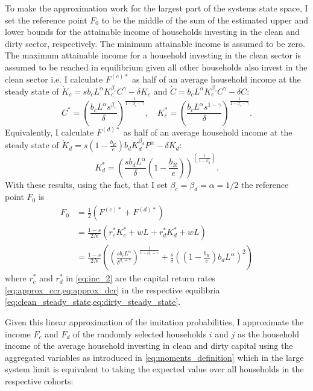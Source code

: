 To make the approximation work for the largest part of the systems state space, I set the reference point $F_0$ to be the middle of the sum of the estimated upper and lower bounds for the attainable income of households investing in the clean and dirty sector, respectively. The minimum attainable income is assumed to be zero. The maximum attainable income for a household investing in the clean sector is assumed to be reached in equilibrium given all other households also invest in the clean sector i.e. I calculate $F^{(c)*}$ as half of an average household income at the steady state of $\dot{K}_c = s b_c L^\alpha K_c^{\beta_c} C^\gamma - \delta K_c$ and $\dot{C} = b_c L^\alpha K_c^{\beta_c} C^\gamma - \delta C$:
\begin{equation}
	C^* = \left( \frac{b_c L^\alpha s^{\beta_c}}{\delta}\right)^{\frac{1}{1-\beta_c-\gamma}}, \quad K_c^* = \left( \frac{b_c L^\alpha s^{1-\gamma}}{\delta}\right)^{\frac{1}{1-\beta_c-\gamma}}.
	\label{eq:clean_steady_state}
\end{equation}
Equivalently, I calculate $F^{(d)*}$ as half of an average household income at the steady state of $ \dot{K}_d = s \left(1 - \frac{b_R}{e} \right) b_d K_d^{\beta_d} P^{\alpha} - \delta K_d $:
\begin{equation}
	K_d^* = \left( \frac{s b_d L^\alpha}{\delta} \left(1 - \frac{b_R}{e} \right)\right)^{\left(\frac{1}{1 - \beta_d} \right)}.
	\label{eq:dirty_steady_state}
\end{equation}
With these results, using the fact, that I set $\beta_c = \beta_d = \alpha = 1/2$ the reference point $F_0$ is
\begin{align}
	F_0 &= \frac{1}{2}\left(F^{(c)*} + F^{(d)*}  \right) \nonumber \\
	&= \frac{1-s}{2N}\left(r_c^* K_c^* + w L + r_d^* K_d^* + w L\right) \label{eq:inc_2}\\
	&= \frac{1-s}{2N}\left( \left( \frac{s b_c L^{\alpha}}{\delta^{\beta_c + \gamma}} \right)^{\frac{1}{1-\beta_c - \gamma}} + \frac{s}{\delta}\left( \left( 1 - \frac{b_R}{e} \right) b_d L^{\alpha} \right)^2 \right)
\end{align}
where $r_c^*$ and $r_d^*$ in \cref{eq:inc_2} are the capital return rates \cref{eq:approx_ccr,eq:approx_dcr} in the respective equilibria \cref{eq:clean_steady_state,eq:dirty_steady_state}.

Given this linear approximation of the imitation probabilities, I approximate the income $F_c$ and $F_d$ of the randomly selected households $i$ and $j$ as the household income of the average household investing in clean and dirty capital using the aggregated variables as introduced in \cref{eq:moments_definition} which in the large system limit is equivalent to taking the expected value over all households in the respective cohorts:

